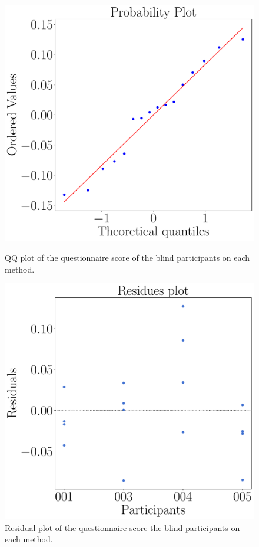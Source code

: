 \begin{figure}[!htb]
    \centering
    \begin{minipage}{0.45\textwidth}
        \centering
        \includegraphics[width = 0.8\linewidth]{Resultados/Questionario/Figuras/pdf/qqplot_questionnaires_blind.pdf}
        \caption{QQ plot of the questionnaire score of the blind participants on each method.}
        \label{fig:qqplot_questionnaires_blind}
    \end{minipage}
    \begin{minipage}{0.075\textwidth}
        \hfill
    \end{minipage}
    \begin{minipage}{0.45\textwidth}
        \centering
        \includegraphics[width = 0.8\linewidth]{Resultados/Questionario/Figuras/pdf/residplot_questionnaires_blind.pdf}
        \caption{Residual plot of the questionnaire score the blind participants on each method.}
        \label{fig:residplot_questionnaires_blind}
    \end{minipage}
\end{figure}

